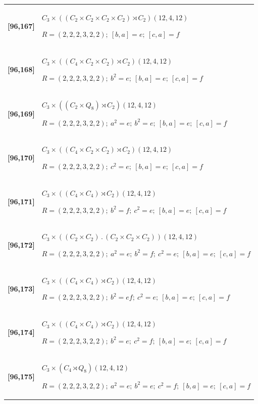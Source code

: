\documentclass[UTF8,fontset=fandol,11pt,a4paper]{ctexart}
\begin{document}
\begin{longtable}{@{}p{17mm}>{\raggedright\arraybackslash}p{141mm}@{}}
\textbf{[96,167]} & $C_{3}\times ((C_{2}\times C_{2}\times C_{2}\times C_{2})\rtimes C_{2})$\quad $(12,4,12)$\par\(R=(2,2,2,3,2,2);\allowbreak\ [b,a]=e;\allowbreak\ [c,a]=f\)\\[3pt]

\textbf{[96,168]} & $C_{3}\times ((C_{4}\times C_{2}\times C_{2})\rtimes C_{2})$\quad $(12,4,12)$\par\(R=(2,2,2,3,2,2);\allowbreak\ b^{2}=e;\allowbreak\ [b,a]=e;\allowbreak\ [c,a]=f\)\\[3pt]

\textbf{[96,169]} & $C_{3}\times ((C_{2}\times Q_{8})\rtimes C_{2})$\quad $(12,4,12)$\par\(R=(2,2,2,3,2,2);\allowbreak\ a^{2}=e;\allowbreak\ b^{2}=e;\allowbreak\ [b,a]=e;\allowbreak\ [c,a]=f\)\\[3pt]

\textbf{[96,170]} & $C_{3}\times ((C_{4}\times C_{2}\times C_{2})\rtimes C_{2})$\quad $(12,4,12)$\par\(R=(2,2,2,3,2,2);\allowbreak\ c^{2}=e;\allowbreak\ [b,a]=e;\allowbreak\ [c,a]=f\)\\[3pt]

\textbf{[96,171]} & $C_{3}\times ((C_{4}\times C_{4})\rtimes C_{2})$\quad $(12,4,12)$\par\(R=(2,2,2,3,2,2);\allowbreak\ b^{2}=f;\allowbreak\ c^{2}=e;\allowbreak\ [b,a]=e;\allowbreak\ [c,a]=f\)\\[3pt]

\textbf{[96,172]} & $C_{3}\times ((C_{2}\times C_{2})\mathbin{.} (C_{2}\times C_{2}\times C_{2}))$\quad $(12,4,12)$\par\(R=(2,2,2,3,2,2);\allowbreak\ a^{2}=e;\allowbreak\ b^{2}=f;\allowbreak\ c^{2}=e;\allowbreak\ [b,a]=e;\allowbreak\ [c,a]=f\)\\[3pt]

\textbf{[96,173]} & $C_{3}\times ((C_{4}\times C_{4})\rtimes C_{2})$\quad $(12,4,12)$\par\(R=(2,2,2,3,2,2);\allowbreak\ b^{2}=ef;\allowbreak\ c^{2}=e;\allowbreak\ [b,a]=e;\allowbreak\ [c,a]=f\)\\[3pt]

\textbf{[96,174]} & $C_{3}\times ((C_{4}\times C_{4})\rtimes C_{2})$\quad $(12,4,12)$\par\(R=(2,2,2,3,2,2);\allowbreak\ b^{2}=e;\allowbreak\ c^{2}=f;\allowbreak\ [b,a]=e;\allowbreak\ [c,a]=f\)\\[3pt]

\textbf{[96,175]} & $C_{3}\times (C_{4}\rtimes Q_{8})$\quad $(12,4,12)$\par\(R=(2,2,2,3,2,2);\allowbreak\ a^{2}=e;\allowbreak\ b^{2}=e;\allowbreak\ c^{2}=f;\allowbreak\ [b,a]=e;\allowbreak\ [c,a]=f\)\\[3pt]


\end{longtable}
\end{document}
